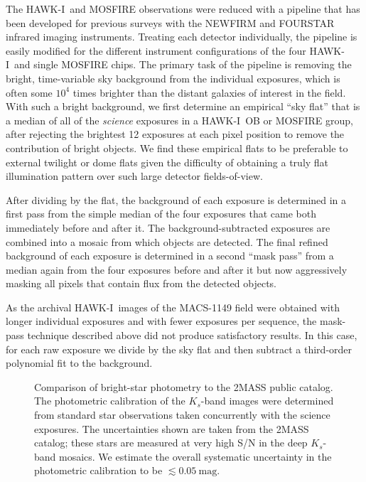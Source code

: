 \documentclass[preprint2]{aastex6}
\gdef\HAWKI{\mbox{HAWK-I}}
\begin{document}
The \HAWKI\ and MOSFIRE observations were reduced with a pipeline that has been developed for previous surveys with the NEWFIRM \citep[NMBS;][]{whitaker:nmbs} and FOURSTAR \citep[zFOURGE;][, Labb\'e in prep]{spitler:12} infrared imaging instruments.  Treating each detector individually, the pipeline is easily modified for the different instrument configurations of the four \HAWKI\ and single MOSFIRE chips.  The primary task of the pipeline is removing the bright, time-variable sky background from the individual exposures, which is often some $10^4$ times brighter than the distant galaxies of interest in the field.  With such a bright background, we first determine an empirical ``sky flat'' that is a median of all of the \textit{science} exposures in a \HAWKI\ OB or MOSFIRE group, after rejecting the brightest 12 exposures at each pixel position to remove the contribution of bright objects.  We find these empirical flats to be preferable to external twilight or dome flats given the difficulty of obtaining a truly flat illumination pattern over such large detector fields-of-view.  

After dividing by the flat, the background of each exposure is determined in a first pass from the simple median of the four exposures that came both immediately before and after it.  The background-subtracted exposures are combined into a mosaic from which objects are detected.  The final refined background of each exposure is determined in a second ``mask pass'' from a median again from the four exposures before and after it but now aggressively masking all pixels that contain flux from the detected objects.

As the archival \HAWKI\ images of the MACS-1149 field were obtained with longer individual exposures and with fewer exposures per sequence, the mask-pass technique described above did not produce satisfactory results.  In this case, for each raw exposure we divide by the sky flat and then subtract a third-order polynomial fit to the background.  

\begin{figure}[!t]
\caption{Comparison of bright-star photometry to the 2MASS public catalog.  The photometric calibration of the $K_s$-band images were determined from standard star observations taken concurrently with the science exposures.  The uncertainties shown are taken from the 2MASS catalog; these stars are measured at very high S/N in the deep $K_s$-band mosaics.  We estimate the overall systematic uncertainty in the photometric calibration to be $\lesssim0.05~\mathrm{mag}$.\label{fig:2mass}}  
\end{figure}
\end{document}
